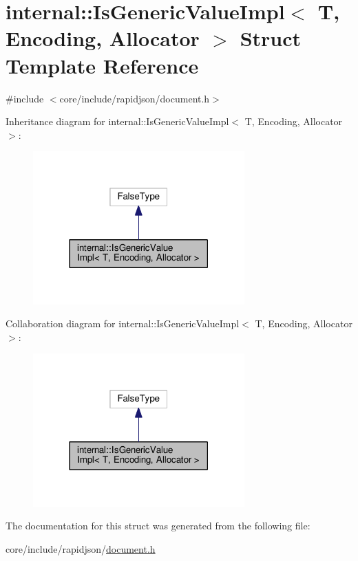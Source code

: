 \hypertarget{structinternal_1_1IsGenericValueImpl}{}\section{internal\+:\+:Is\+Generic\+Value\+Impl$<$ T, Encoding, Allocator $>$ Struct Template Reference}
\label{structinternal_1_1IsGenericValueImpl}


{\ttfamily \#include $<$core/include/rapidjson/document.\+h$>$}



Inheritance diagram for internal\+:\+:Is\+Generic\+Value\+Impl$<$ T, Encoding, Allocator $>$\+:
\nopagebreak
\begin{figure}[H]
\begin{center}
\leavevmode
\includegraphics[width=230pt]{structinternal_1_1IsGenericValueImpl__inherit__graph}
\end{center}
\end{figure}


Collaboration diagram for internal\+:\+:Is\+Generic\+Value\+Impl$<$ T, Encoding, Allocator $>$\+:
\nopagebreak
\begin{figure}[H]
\begin{center}
\leavevmode
\includegraphics[width=230pt]{structinternal_1_1IsGenericValueImpl__coll__graph}
\end{center}
\end{figure}


The documentation for this struct was generated from the following file\+:\begin{DoxyCompactItemize}
\item 
core/include/rapidjson/\hyperlink{document_8h}{document.\+h}\end{DoxyCompactItemize}
